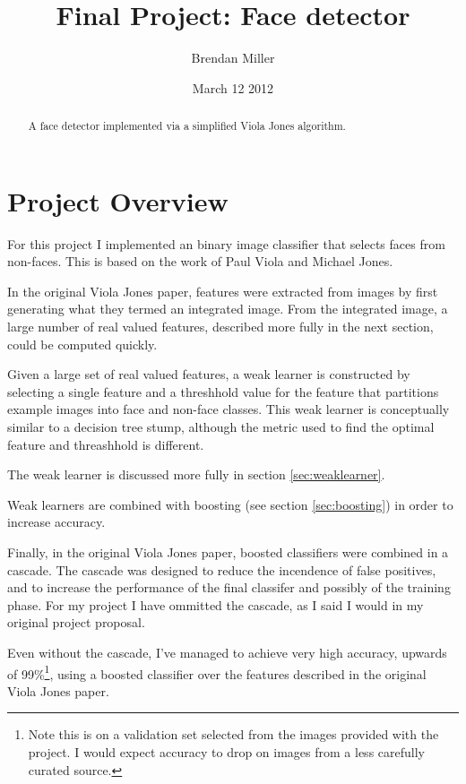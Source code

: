 \documentclass{article}
\title{Final Project: Face detector}
\author{Brendan Miller}
\date{March 12 2012}
\begin{document}
\maketitle

\begin{abstract}
A face detector implemented via a simplified Viola Jones algorithm.
\end{abstract}

\section{Project Overview}

For this project I implemented an binary image classifier that selects
faces from non-faces. This is based on the work of Paul Viola and
Michael Jones\cite{violajones2001}.

In the original Viola Jones paper, features were extracted from images
by first generating what they termed an integrated image. From the
integrated image, a large number of real valued features, described more fully in
the next section, could be computed quickly.

Given a large set of real valued features, a weak learner is
constructed by selecting a single feature and a threshhold value for
the feature that partitions example images into face and non-face
classes. This weak learner is conceptually similar to a decision tree
stump, although the metric used to find the optimal feature and
threashhold is different.

The weak learner is discussed more fully in section \ref{sec:weaklearner}.

Weak learners are combined with boosting (see section
\ref{sec:boosting}) in order to increase accuracy.

Finally, in the original Viola Jones paper, boosted classifiers were
combined in a cascade. The cascade was designed to reduce the
incendence of false positives, and to increase the performance of the
final classifer and possibly of the training phase. For my project I
have ommitted the cascade, as I said I would in my original project
proposal.

Even without the cascade, I've managed to achieve very high accuracy,
upwards of 99\%\footnote{Note this is on a validation set selected
  from the images provided with the project. I would expect accuracy
  to drop on images from a less carefully curated source.}, using a
boosted classifier over the features described in the original Viola
Jones paper.
\end{document}

